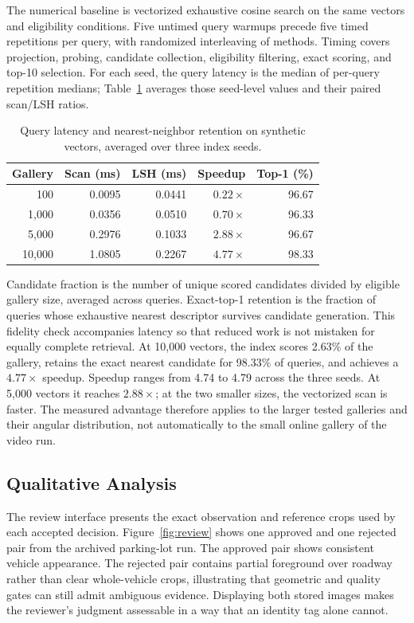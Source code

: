 \documentclass[conference]{IEEEtran}
\begin{document}
The numerical baseline is vectorized exhaustive cosine search on the same vectors and eligibility conditions. Five untimed query warmups precede five timed repetitions per query, with randomized interleaving of methods. Timing covers projection, probing, candidate collection, eligibility filtering, exact scoring, and top-10 selection. For each seed, the query latency is the median of per-query repetition medians; Table~\ref{tab:search} averages those seed-level values and their paired scan/LSH ratios.

\begin{table}[t]
\centering\small
\setlength{\tabcolsep}{3pt}
\caption{Query latency and nearest-neighbor retention on synthetic vectors, averaged over three index seeds.}
\label{tab:search}
\begin{tabular}{rrrrr}
\toprule Gallery & Scan (ms) & LSH (ms) & Speedup & Top-1 (\%)\\\midrule
100 & 0.0095 & 0.0441 & $0.22\times$ & 96.67\\
1,000 & 0.0356 & 0.0510 & $0.70\times$ & 96.33\\
5,000 & 0.2976 & 0.1033 & $2.88\times$ & 96.67\\
10,000 & 1.0805 & 0.2267 & $4.77\times$ & 98.33\\\bottomrule
\end{tabular}
\end{table}

Candidate fraction is the number of unique scored candidates divided by eligible gallery size, averaged across queries. Exact-top-1 retention is the fraction of queries whose exhaustive nearest descriptor survives candidate generation. This fidelity check accompanies latency so that reduced work is not mistaken for equally complete retrieval. At 10,000 vectors, the index scores 2.63\% of the gallery, retains the exact nearest candidate for 98.33\% of queries, and achieves a $4.77\times$ speedup. Speedup ranges from 4.74 to 4.79 across the three seeds. At 5,000 vectors it reaches $2.88\times$; at the two smaller sizes, the vectorized scan is faster. The measured advantage therefore applies to the larger tested galleries and their angular distribution, not automatically to the small online gallery of the video run.

\subsection{Qualitative Analysis}
The review interface presents the exact observation and reference crops used by each accepted decision. Figure~\ref{fig:review} shows one approved and one rejected pair from the archived parking-lot run. The approved pair shows consistent vehicle appearance. The rejected pair contains partial foreground over roadway rather than clear whole-vehicle crops, illustrating that geometric and quality gates can still admit ambiguous evidence. Displaying both stored images makes the reviewer's judgment assessable in a way that an identity tag alone cannot.
\end{document}

